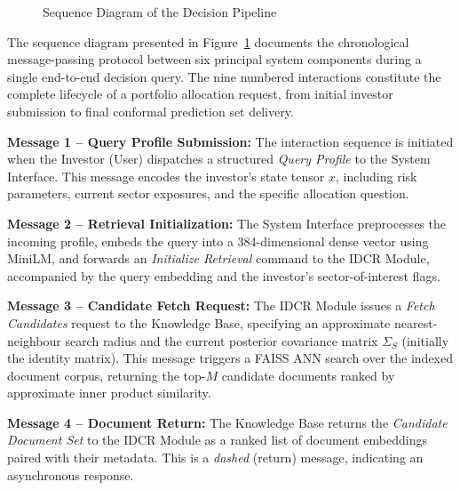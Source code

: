 \documentclass[12pt,a4paper,oneside]{report}
\theoremstyle{definition}
\theoremstyle{remark}
\begin{document}
\begin{figure}[H]
{
    }
    \caption{Sequence Diagram of the Decision Pipeline}
    \label{fig:seq_diagram}
\end{figure}

The sequence diagram presented in Figure~\ref{fig:seq_diagram} documents the chronological message-passing protocol between six principal system components during a single end-to-end decision query. The nine numbered interactions constitute the complete lifecycle of a portfolio allocation request, from initial investor submission to final conformal prediction set delivery.

\textbf{Message 1 -- Query Profile Submission:} The interaction sequence is initiated when the Investor (User) dispatches a structured \emph{Query Profile} to the System Interface. This message encodes the investor's state tensor $x$, including risk parameters, current sector exposures, and the specific allocation question.

\textbf{Message 2 -- Retrieval Initialization:} The System Interface preprocesses the incoming profile, embeds the query into a 384-dimensional dense vector using MiniLM, and forwards an \emph{Initialize Retrieval} command to the IDCR Module, accompanied by the query embedding and the investor's sector-of-interest flags.

\textbf{Message 3 -- Candidate Fetch Request:} The IDCR Module issues a \emph{Fetch Candidates} request to the Knowledge Base, specifying an approximate nearest-neighbour search radius and the current posterior covariance matrix $\Sigma_S$ (initially the identity matrix). This message triggers a FAISS ANN search over the indexed document corpus, returning the top-$M$ candidate documents ranked by approximate inner product similarity.

\textbf{Message 4 -- Document Return:} The Knowledge Base returns the \emph{Candidate Document Set} to the IDCR Module as a ranked list of document embeddings paired with their metadata. This is a \emph{dashed} (return) message, indicating an asynchronous response.
\end{document}
